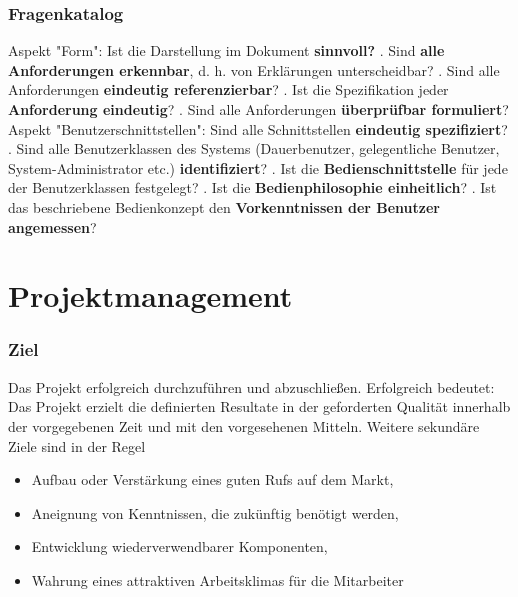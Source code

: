 \documentclass{book}
\begin{document}
    \subsection{Fragenkatalog}
    Aspekt "Form":
    Ist die Darstellung im Dokument\textbf{ sinnvoll?}  . Sind \textbf{alle Anforderungen erkennbar}, d. h. von Erklärungen unterscheidbar?  . Sind alle Anforderungen \textbf{eindeutig referenzierbar}? . Ist die Spezifikation jeder \textbf{Anforderung eindeutig}? . Sind alle Anforderungen \textbf{überprüfbar formuliert}? \newline
    Aspekt "Benutzerschnittstellen":
    Sind alle Schnittstellen \textbf{eindeutig spezifiziert}? . Sind alle Benutzerklassen des Systems (Dauerbenutzer, gelegentliche
    Benutzer, System-Administrator etc.) \textbf{identifiziert}? . Ist die \textbf{Bedienschnittstelle} für jede der Benutzerklassen festgelegt? . Ist die \textbf{Bedienphilosophie einheitlich}? . Ist das beschriebene Bedienkonzept den \textbf{Vorkenntnissen der Benutzer
    angemessen}?

    \chapter{Projektmanagement}
    \subsection{Ziel}
    Das Projekt erfolgreich durchzuführen und abzuschließen. Erfolgreich bedeutet:
    Das Projekt erzielt die definierten Resultate in der geforderten
    Qualität innerhalb der vorgegebenen Zeit und mit den
    vorgesehenen Mitteln.
    Weitere sekundäre Ziele sind in der Regel
    \begin{itemize}
        \item  Aufbau oder Verstärkung eines guten Rufs auf dem Markt,
        \item Aneignung von Kenntnissen, die zukünftig benötigt werden,
        \item Entwicklung wiederverwendbarer Komponenten,
        \item Wahrung eines attraktiven Arbeitsklimas für die Mitarbeiter
    \end{itemize}
\end{document}

